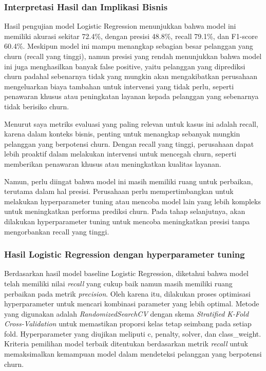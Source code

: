 \subsubsection{Interpretasi Hasil dan Implikasi Bisnis}
Hasil pengujian model Logistic Regression menunjukkan bahwa model ini memiliki akurasi sekitar 72.4\%, dengan presisi 48.8\%, recall 79.1\%, dan F1-score 60.4\%. Meskipun model ini mampu menangkap sebagian besar pelanggan yang churn (recall yang tinggi), namun presisi yang rendah menunjukkan bahwa model ini juga menghasilkan banyak false positive, yaitu pelanggan yang diprediksi churn padahal sebenarnya tidak yang mungkin akan mengakibatkan perusahaan mengeluarkan biaya tambahan untuk intervensi yang tidak perlu, seperti penawaran khusus atau peningkatan layanan kepada pelanggan yang sebenarnya tidak berisiko churn.

Menurut saya metriks evaluasi yang paling relevan untuk kasus ini adalah recall, karena dalam konteks bisnis, penting untuk menangkap sebanyak mungkin pelanggan yang berpotensi churn. Dengan recall yang tinggi, perusahaan dapat lebih proaktif dalam melakukan intervensi untuk mencegah churn, seperti memberikan penawaran khusus atau meningkatkan kualitas layanan.

Namun, perlu diingat bahwa model ini masih memiliki ruang untuk perbaikan, terutama dalam hal presisi. Perusahaan perlu mempertimbangkan untuk melakukan hyperparameter tuning atau mencoba model lain yang lebih kompleks untuk meningkatkan performa prediksi churn. Pada tahap selanjutnya, akan dilakukan hyperparameter tuning untuk mencoba meningkatkan presisi tanpa mengorbankan recall yang tinggi.

\subsubsection{Hasil Logistic Regression dengan hyperparameter tuning}

Berdasarkan hasil model baseline Logistic Regression, diketahui bahwa model telah memiliki nilai \textit{recall} yang cukup baik namun masih memiliki ruang perbaikan pada metrik \textit{precision}. Oleh karena itu, dilakukan proses optimisasi hyperparameter untuk mencari kombinasi parameter yang lebih optimal. Metode yang digunakan adalah \textit{RandomizedSearchCV} dengan skema \textit{Stratified K-Fold Cross-Validation} untuk memastikan proporsi kelas tetap seimbang pada setiap fold. Hyperparameter yang diujikan meliputi c, penalty, solver, dan class\_weight. Kriteria pemilihan model terbaik ditentukan berdasarkan metrik \textit{recall} untuk memaksimalkan kemampuan model dalam mendeteksi pelanggan yang berpotensi churn.

